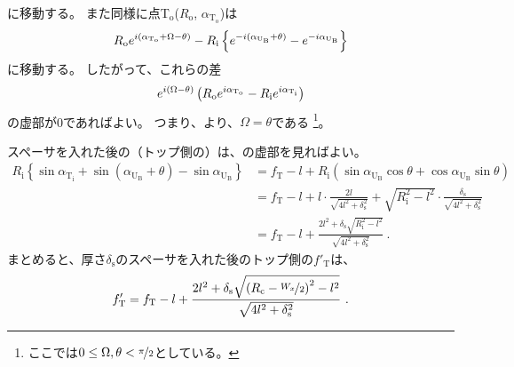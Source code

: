 に移動する。
また同様に点T$_\mathrm o$($R_\mathrm o$, $\alpha_{\mathrm T_\mathrm o}$)は
\begin{align*}
  \notag
  R_\mathrm oe^{i(\alpha_{\mathrm T_\mathrm o} + \Omega - \theta)}
  -R_\mathrm i\left\{e^{-i(\alpha_{\mathrm U_\mathrm B} + \theta)}-e^{-i\alpha_{\mathrm U_\mathrm B}}\right\}
\end{align*}
に移動する。
したがって、これらの差
\begin{align*}
  \notag
  e^{i(\Omega - \theta)}\left(R_\mathrm oe^{i\alpha_{\mathrm T_\mathrm o}} - R_\mathrm ie^{i\alpha_{\mathrm T_\mathrm i}}\right)
\end{align*}
の虚部が0であればよい。
つまり、より、$\Omega = \theta$である
\footnote{ここでは$0 \leq \Omega, \theta < \nicefrac \pi2$としている。}。

スペーサを入れた後の（トップ側の）\AlocationLength は、の虚部を見ればよい。
\begin{align*}
  R_\mathrm i\left\{\sin\alpha_{\mathrm T_\mathrm i} + \sin(\alpha_{\mathrm U_\mathrm B} + \theta) - \sin\alpha_{\mathrm U_\mathrm B}\right\}
  &= f_\mathrm T -l
     +R_\mathrm i\left(\sin\alpha_{\mathrm U_\mathrm B}\cos\theta + \cos\alpha_{\mathrm U_\mathrm B}\sin\theta\right)\\
  &= f_\mathrm T -l+l\cdot\frac{2l}{\sqrt{4l^2+\delta_\mathrm s^2}}
     +\sqrt{R_\mathrm i^2-l^2}\cdot\frac{\delta_\mathrm s}{\sqrt{4l^2+\delta_\mathrm s^2}}\\
  &= f_\mathrm T -l+\frac{2l^2+\delta_\mathrm s\sqrt{R_\mathrm i^2-l^2}}{\sqrt{4l^2+\delta_\mathrm s^2}}~.
\end{align*}
まとめると、厚さ$\delta_\mathrm s$のスペーサを入れた後のトップ側の\AlocationLength$f'_\mathrm T$は、
\begin{align*}
  f'_\mathrm T
  = f_\mathrm T -l
    +\frac{2l^2+\delta_\mathrm s\sqrt{\left(R_\mathrm c-\nicefrac{W_x}2\right)^2-l^2}}{\sqrt{4l^2+\delta_\mathrm s^2}}~.
\end{align*}


